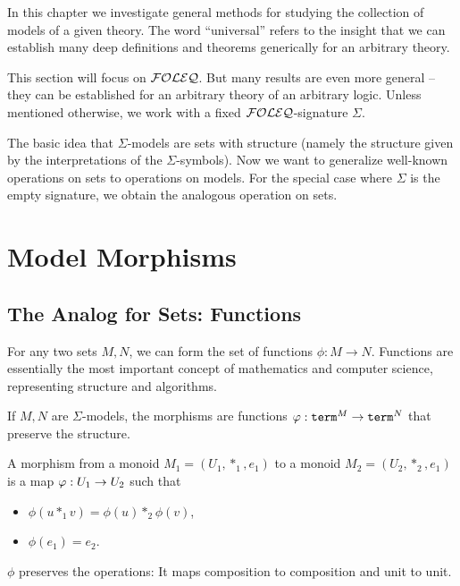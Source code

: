 In this chapter we investigate general methods for studying the collection of models of a given theory.
The word ``universal'' refers to the insight that we can establish many deep definitions and theorems generically for an arbitrary theory.

This section will focus on ${\mathcal{FOLEQ}}$.
But many results are even more general -- they can be established for an arbitrary theory of an arbitrary logic.
Unless mentioned otherwise, we work with a fixed ${\mathcal{FOLEQ}}$-signature $\Sigma$.

The basic idea that $\Sigma$-models are sets with structure (namely the structure given by the interpretations of the $\Sigma$-symbols).
Now we want to generalize well-known operations on sets to operations on models.
For the special case where $\Sigma$ is the empty signature, we obtain the analogous operation on sets.

\section{Model Morphisms}\label{sec:fol:modelmorphisms}\label{sec:univ:morph}

\subsection{The Analog for Sets: Functions}

For any two sets $M,N$, we can form the set of functions $\phi:M\to N$.
Functions are essentially the most important concept of mathematics and computer science, representing structure and algorithms.

If $M,N$ are $\Sigma$-models, the morphisms are functions $\varphi:\mathtt{term}^M\to \mathtt{term}^N$ that preserve the structure.

\begin{example}
A morphism from a monoid $M_1=(U_1,*_1,e_1)$ to a monoid $M_2=(U_2,*_2,e_1)$ is a map $\varphi:U_1\rightarrow U_2$ such that
\begin{itemize}
  \item $\phi(u *_1 v)=\phi(u) *_2 \phi(v)$,
	\item $\phi(e_1)=e_2$.
\end{itemize}
$\phi$ preserves the operations: It maps composition to composition and unit to unit.
\end{example}

